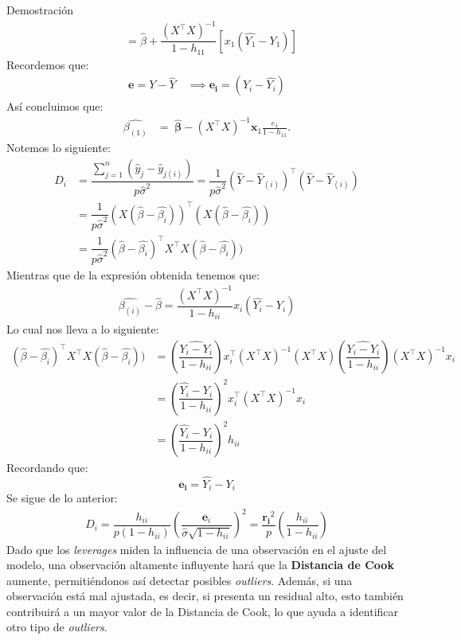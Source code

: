 \documentclass[a4paper,11pt]{article}
\begin{document}
\begin{demostracion}{Demostración}
\begin{align*}
                           & =\hat{\beta}+\dfrac{(X^\top X)^{-1} }{1-h_{11} }\left[x_1(\hat{Y_1}-Y_1) \right]
    \end{align*}
    Recordemos que:
    \begin{align*}
        \mathbf{e}=Y-\hat{Y}\quad \implies\mathbf{e_i}=(Y_i-\hat{Y_i} )
    \end{align*}
    Así concluimos que:
    \begin{align*}
        \hat{\beta_{(1)} }
         & = \; \widehat{\boldsymbol{\beta}}-(X^{\top}X)^{-1}\boldsymbol{x}_1 \frac{e_1}{1-h_{11}}.
    \end{align*}
    Notemos lo siguiente:
    \begin{align*}
        D_i & =\dfrac{\sum_{j=1}^n(\hat{y}_j-\hat{y}_{j(i)} ) }{p\hat{\sigma}^2}=\dfrac{1}{p\hat{\sigma}^2}(\hat{Y}- \hat{Y}_{(i)} )^\top(\hat{Y}- \hat{Y}_{(i)} ) \\
            & =\dfrac{1}{p\hat{\sigma}^2}(X(\hat{\beta}-\hat{\beta_i}))^\top(X(\hat{\beta}-\hat{\beta_i}))                                                         \\
            & =\dfrac{1}{p\hat{\sigma}^2}(\hat{\beta}-\hat{\beta_i})^\top X^\top X(\hat{\beta}-\hat{\beta_i}))
    \end{align*}
    Mientras que de la expresión obtenida tenemos que:
    \begin{align*}
        \hat{\beta_{(i)} }-\hat{\beta}=\dfrac{(X^\top X)^{-1} }{1-h_{ii} }x_i(\hat{Y_i}-Y_i)
    \end{align*}
    Lo cual nos lleva a lo siguiente:
    \begin{align*}
        (\hat{\beta}-\hat{\beta_i})^\top X^\top X(\hat{\beta}-\hat{\beta_i})) & =\left(\dfrac{\hat{Y_i-Y_i}}{1-h_{ii} }\right)x_i^\top(X^\top X)^{-1} (X^\top X)\left(\dfrac{\hat{Y_i-Y_i}}{1-h_{ii} }\right)(X^\top X)^{-1}x_i \\
                                                                              & =\left(\dfrac{\hat{Y_i}-Y_i}{1-h_{ii} }\right)^2 x_i^\top (X^\top X)^{-1}x_i                                                                    \\
                                                                              & =\left(\dfrac{\hat{Y_i}-Y_i}{1-h_{ii} }\right)^2h_{ii}
    \end{align*}
    Recordando que:
    \[
        \mathbf{e_i}=\hat{Y_i}-Y_i
    \]
    Se sigue de lo anterior:
    \begin{align*}
        D_i=\dfrac{h_{ii} }{p(1-h_{ii}) }\left(\dfrac{\mathbf{e}_i}{\hat{\sigma}\sqrt{1-h_{ii}} }\right)^2=\dfrac{\mathbf{r_i}^2}{p}\left(\dfrac{h_{ii} }{1-h_{ii} }\right)
    \end{align*}
    Dado que los \textit{leverages} miden la influencia de una observación en el ajuste del modelo, una observación altamente influyente hará que la \textbf{Distancia de Cook} aumente, permitiéndonos así detectar posibles \textit{outliers}. Además, si una observación está mal ajustada, es decir, si presenta un residual alto, esto también contribuirá a un mayor valor de la Distancia de Cook, lo que ayuda a identificar otro tipo de \textit{outliers}.
\end{demostracion}
\end{document}
